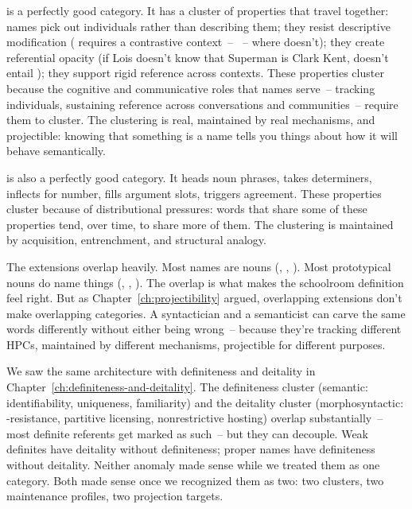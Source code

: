  is a perfectly good category. It has a cluster of properties that travel together: names pick out individuals rather than describing them; they resist descriptive modification ( requires a contrastive context~-- ~-- where  doesn't); they create referential opacity (if Lois doesn't know that Superman is Clark Kent,  doesn't entail ); they support rigid reference across contexts. These properties cluster because the cognitive and communicative roles that names serve~-- tracking individuals, sustaining reference across conversations and communities~-- require them to cluster. The clustering is real, maintained by real mechanisms, and projectible: knowing that something is a name tells you things about how it will behave semantically.

 is also a perfectly good category. It heads noun phrases, takes determiners, inflects for number, fills argument slots, triggers agreement. These properties cluster because of distributional pressures: words that share some of these properties tend, over time, to share more of them. The clustering is maintained by acquisition, entrenchment, and structural analogy.

The extensions overlap heavily. Most names are nouns (, , ). Most prototypical nouns do name things (, , ). The overlap is what makes the schoolroom definition feel right. But as Chapter~\ref{ch:projectibility} argued, overlapping extensions don't make overlapping categories. A syntactician and a semanticist can carve the same words differently without either being wrong~-- because they're tracking different HPCs, maintained by different mechanisms, projectible for different purposes.

We saw the same architecture with definiteness and deitality in Chapter~\ref{ch:definiteness-and-deitality}. The definiteness cluster (semantic: identifiability, uniqueness, familiarity) and the deitality cluster (morphosyntactic: -resistance, partitive licensing, nonrestrictive hosting) overlap substantially~-- most definite referents get marked as such~-- but they can decouple. Weak definites have deitality without definiteness; proper names have definiteness without deitality. Neither anomaly made sense while we treated them as one category. Both made sense once we recognized them as two: two clusters, two maintenance profiles, two projection targets.

